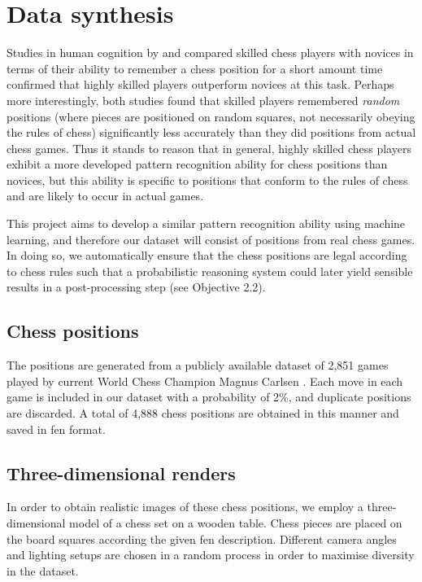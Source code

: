 \section{Data synthesis}
Studies in human cognition by \textcite{bilalic2010} and \textcite{zhou2018} compared skilled chess players with novices in terms of their ability to remember a chess position for a short amount time confirmed that highly skilled players outperform novices at this task.
Perhaps more interestingly, both studies found that skilled players remembered \emph{random} positions (where pieces are positioned on random squares, not necessarily obeying the rules of chess) significantly less accurately than they did positions from actual chess games. 
Thus it stands to reason that in general, highly skilled chess players exhibit a more developed pattern recognition ability for chess positions than novices, but this ability is specific to positions that conform to the rules of chess and are likely to occur in actual games.

This project aims to develop a similar pattern recognition ability using machine learning, and therefore our dataset will consist of positions from real chess games. 
In doing so, we automatically ensure that the chess positions are legal according to chess rules such that a probabilistic reasoning system could later yield sensible results in a post-processing step (see Objective 2.2).

\subsection{Chess positions}
The positions are generated from a publicly available dataset of 2,851 games played by current World Chess Champion Magnus Carlsen \cite{64squares2020}.
Each move in each game is included in our dataset with a probability of 2\%, and duplicate positions are discarded.
A total of 4,888 chess positions are obtained in this manner and saved in \gls{fen} format.

\subsection{Three-dimensional renders}
In order to obtain realistic images of these chess positions, we employ a three-dimensional model of a chess set on a wooden table. 
Chess pieces are placed on the board squares according the given \gls{fen} description. 
Different camera angles and lighting setups are chosen in a random process in order to maximise diversity in the dataset.

